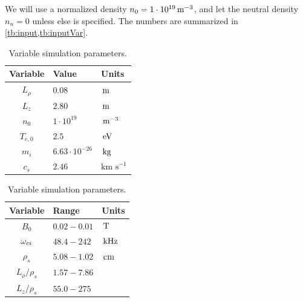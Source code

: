 We will use a normalized density $n_0 = 1\cdot 10^{19} \, \text{m}^{-3}$, and let the neutral density $n_n=0$ unless else is specified.
The numbers are summarized in \cref{tb:input,tb:inputVar}.
%
\begin{table}[!htb]
    \begin{minipage}{.45\linewidth}
      \centering
        \caption{Fixed simulation parameters.}
            \begin{tabular}{c|ll}
            \hline\hline
            Variable & Value & Units\\
            \hline
            $L_\rho$  & $0.08$              & $\, \text{m}$              \\
            $L_z$     & $2.80$              & $\, \text{m}$              \\
            $n_0$     & $1\cdot 10^{19}$    & $\, \text{m}^{-3}$         \\
            $T_{e,0}$ & $2.5$               & $\, \text{eV}$             \\
            $m_i$     & $6.63\cdot10^{-26}$ & $\, \text{kg}$             \\
            $c_s$     & $2.46$              & $\text{km s}^{-1}$\\
            \hline\hline
            \end{tabular}
            \label{tb:input}
    \end{minipage}
    \hfill
    \begin{minipage}{.45\linewidth}
      \centering
        \caption{Variable simulation parameters.}
            \begin{tabular}{c|ll}
            \hline\hline
            Variable & Range & Units\\
            \hline
            $B_0$           & $0.02 - 0.01$  & $\, \text{T} $ \\
            $\omega_{ci}$      & $48.4 - 242$   & $\, \text{kHz}$\\
            $\rho_s$        & $5.08 - 1.02$  & $\, \text{cm}$ \\
            $L_\rho/\rho_s$ & $1.57 - 7.86$  &       \\
            $L_z/\rho_s$    & $55.0 - 275$   &       \\
            \hline\hline
            \end{tabular}
            \label{tb:inputVar}
    \end{minipage}
\end{table}


